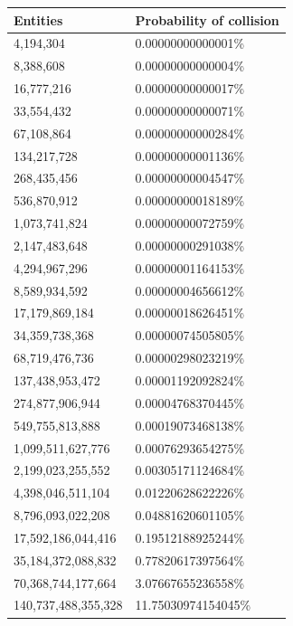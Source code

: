 \begin{figure}
    \centering
    \singlespacing
    \begin{tabular}{|l|l|}
    \hline
    Entities & Probability of collision\\
    \hline
    4,194,304               &   0.00000000000001\%\\
    8,388,608               &   0.00000000000004\%\\
    16,777,216              &   0.00000000000017\%\\
    33,554,432              &   0.00000000000071\%\\
    67,108,864              &   0.00000000000284\%\\
    134,217,728             &   0.00000000001136\%\\
    268,435,456             &   0.00000000004547\%\\
    536,870,912             &   0.00000000018189\%\\
    1,073,741,824           &   0.00000000072759\%\\
    2,147,483,648           &   0.00000000291038\%\\
    4,294,967,296           &   0.00000001164153\%\\
    8,589,934,592           &   0.00000004656612\%\\
    17,179,869,184          &   0.00000018626451\%\\
    34,359,738,368          &   0.00000074505805\%\\
    68,719,476,736          &   0.00000298023219\%\\
    137,438,953,472         &   0.00001192092824\%\\
    274,877,906,944         &   0.00004768370445\%\\
    549,755,813,888         &   0.00019073468138\%\\
    1,099,511,627,776       &   0.00076293654275\%\\
    2,199,023,255,552       &   0.00305171124684\%\\
    4,398,046,511,104       &   0.01220628622226\%\\
    8,796,093,022,208       &   0.04881620601105\%\\
    17,592,186,044,416      &   0.19512188925244\%\\
    35,184,372,088,832      &   0.77820617397564\%\\
    70,368,744,177,664      &   3.07667655236558\%\\
    140,737,488,355,328     &  11.75030974154045\%\\

\end{tabular}
\end{figure}
